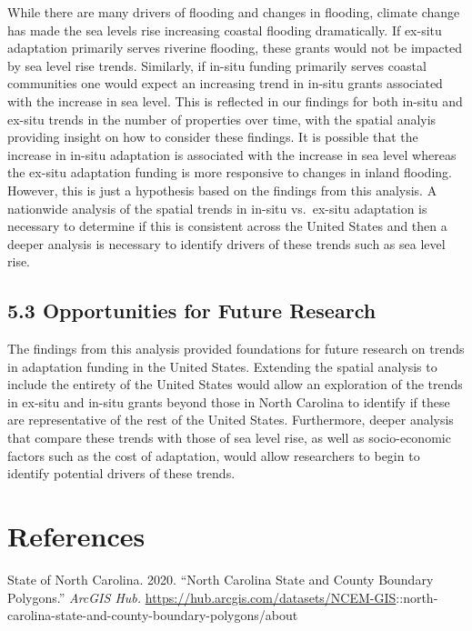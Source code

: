 \documentclass[
  12pt,
]{article}
\begin{document}
While there are many drivers of flooding and changes in flooding,
climate change has made the sea levels rise increasing coastal flooding
dramatically. If ex-situ adaptation primarily serves riverine flooding,
these grants would not be impacted by sea level rise trends. Similarly,
if in-situ funding primarily serves coastal communities one would expect
an increasing trend in in-situ grants associated with the increase in
sea level. This is reflected in our findings for both in-situ and
ex-situ trends in the number of properties over time, with the spatial
analyis providing insight on how to consider these findings. It is
possible that the increase in in-situ adaptation is associated with the
increase in sea level whereas the ex-situ adaptation funding is more
responsive to changes in inland flooding. However, this is just a
hypothesis based on the findings from this analysis. A nationwide
analysis of the spatial trends in in-situ vs.~ex-situ adaptation is
necessary to determine if this is consistent across the United States
and then a deeper analysis is necessary to identify drivers of these
trends such as sea level rise.

\hypertarget{opportunities-for-future-research}{%
\subsection{5.3 Opportunities for Future
Research}\label{opportunities-for-future-research}}

The findings from this analysis provided foundations for future research
on trends in adaptation funding in the United States. Extending the
spatial analysis to include the entirety of the United States would
allow an exploration of the trends in ex-situ and in-situ grants beyond
those in North Carolina to identify if these are representative of the
rest of the United States. Furthermore, deeper analysis that compare
these trends with those of sea level rise, as well as socio-economic
factors such as the cost of adaptation, would allow researchers to begin
to identify potential drivers of these trends.

\newpage

\hypertarget{references}{%
\section{References}\label{references}}

State of North Carolina. 2020. ``North Carolina State and County
Boundary Polygons.'' \emph{ArcGIS Hub.}
\url{https://hub.arcgis.com/datasets/NCEM-GIS}::north-carolina-state-and-county-boundary-polygons/about
\end{document}
